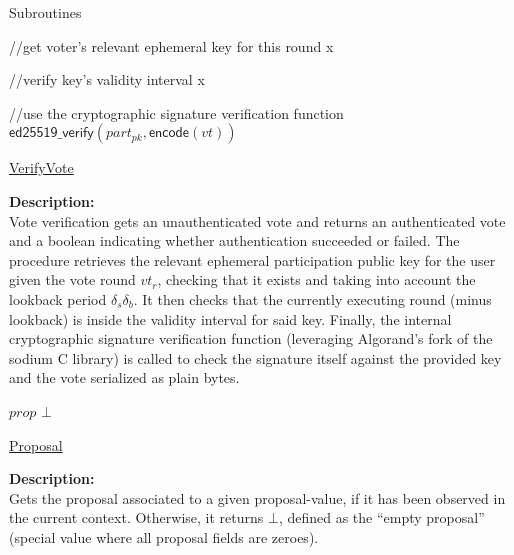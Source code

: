 \documentclass[10pt,a4paper]{article}
\begin{document}
\begin{section}{Subroutines}

\begin{algorithm}[H]\label{algo:verify-part-sign}
    \begin{algorithmic}[1]
        
        //get voter's relevant ephemeral key for this round
        \State x

        //verify key's validity interval
        \State x

        //use the cryptographic signature verification function
        \Return $\mathsf{ed25519\_verify}(part_{pk}, \mathsf{encode}(vt))$
    \EndFunction
    \end{algorithmic}
    \caption{\underline{VerifyVote}}
\end{algorithm}

\noindent \textbf{Description:}\\
Vote verification gets an unauthenticated vote and returns an authenticated vote and a
boolean indicating whether authentication succeeded or failed.
The procedure retrieves the relevant ephemeral participation public key for the user given the vote round $vt_r$,
checking that it exists and taking into account the lookback period $\delta_s\delta_b$.
It then checks that the currently executing round (minus lookback) is inside the validity interval for said key.
Finally, the internal cryptographic signature verification function (leveraging Algorand's fork of the sodium C library)
is called to check the signature itself against the provided key and the vote serialized as plain bytes.


\begin{algorithm}[H]
    \begin{algorithmic}[1]

        \Return $prop$
    \Else
        \Return $\bot$
    \EndIf

    \EndFunction
    \end{algorithmic}
    \caption{\underline{Proposal}}
\end{algorithm}

\noindent \textbf{Description:}\\ Gets the proposal associated to a given proposal-value, 
if it has been observed in the current context.
Otherwise, it returns $\bot$, defined as the ``empty proposal'' (special value where all
proposal fields are zeroes).


\end{section}
\end{document}
